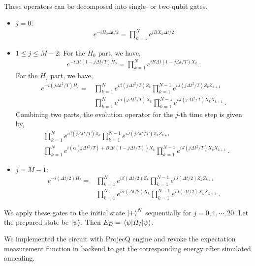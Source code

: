 \documentclass[a4paper, 11pt]{article}
\numberwithin{equation}{section}
\theoremstyle{definition}
\begin{document}
These operators can be decomposed into single- or two-qubit gates.
\begin{itemize}
    \item $j = 0$:
    \begin{align}
     e^{-i H_0 \Delta t /2} = \prod_{k = 1}^N e^{i B X_k \Delta t /2} 
     \end{align}
    
    \item $1 \leq j \leq M-2$: For the $H_0$ part, we have,
    \begin{align}
    e^{-i \Delta t (1 - j \Delta t /T) H_0} = \prod_{k = 1}^N e^{i B \Delta t (1 - j \Delta t /T) X_k} \ .
    \end{align}
    For the $H_I$ part, we have,
    \begin{align}
    e^{-i (j \Delta t^2/T) H_I} = & \prod_{k = 1}^N e^{i \beta (j \Delta t^2/T) Z_k} \prod_{k = 1}^{N-1} e^{i J (j \Delta t^2/T) Z_k Z_{k+1}} \\
    & \prod_{k = 1}^N e^{i \alpha (j \Delta t^2/T) X_k} \prod_{k = 1}^{N-1} e^{i J (j \Delta t^2/T) X_k X_{k+1}} \ .
    \end{align}
    Combining two parts, the evolution operator for the $j$-th time step is given by,
    \begin{align}
    & \prod_{k = 1}^N e^{i \beta (j \Delta t^2/T) Z_k} \prod_{k = 1}^{N-1} e^{i J (j \Delta t^2/T) Z_k Z_{k+1}} \\
    & \prod_{k = 1}^N e^{i \left( \alpha (j \Delta t^2/T) + B \Delta t (1 - j \Delta t /T) \right) X_k} \prod_{k = 1}^{N-1} e^{i J (j \Delta t^2/T) X_k X_{k+1}} \ .
    \end{align}

    \item $j = M-1$: 
    \begin{align}
    e^{-i (\Delta t /2) H_I} = & \prod_{k = 1}^N e^{i \beta (\Delta t /2) Z_k} \prod_{k = 1}^{N-1} e^{i J (\Delta t /2) Z_k Z_{k+1}} \\
    & \prod_{k = 1}^N e^{i \alpha (\Delta t /2) X_k} \prod_{k = 1}^{N-1} e^{i J (\Delta t /2) X_k X_{k+1}} \ .
    \end{align}
\end{itemize}



We apply these gates to the initial state $\ket{+}^N$ sequentially for $j = 0, 1, \cdots, 20$. Let the prepared state be $\ket{\psi}$. Then $E_D = \mel{\psi}{H_I}{\psi}$.

We implemented the circuit with ProjecQ engine and revoke the expectation measurement function in backend to get the corresponding energy after simulated annealing. 
\end{document}
